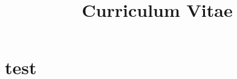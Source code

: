 \documentclass[11pt,a4paper,sans]{moderncv}%
\title{Curriculum Vitae}%
\begin{document}
%
\normalsize%
\makecvtitle%
\section{test}%
\label{sec:test}%

%
\end{document}

